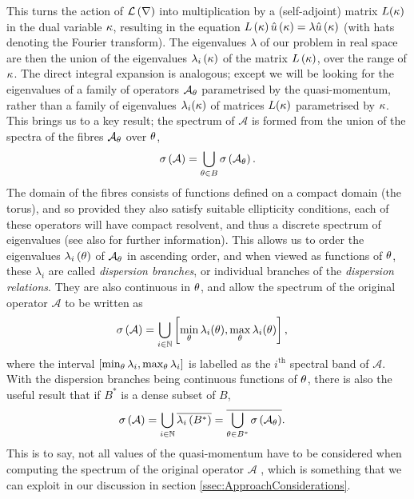 This turns the action of $\mathcal{L}\left( \nabla \right)$ into multiplication by a (self-adjoint) matrix $L(\kappa)$ in the dual variable $\kappa$, resulting in the equation $L\left( \kappa \right)\hat{u}\left( \kappa \right)=\lambda\hat{u}\left( \kappa \right)$ (with hats denoting the Fourier transform).
The eigenvalues $\lambda$ of our problem in real space are then the union of the eigenvalues $\lambda_i\left( \kappa \right)$ of the matrix $L\left( \kappa \right)$, over the range of $\kappa$.
The direct integral expansion is analogous; except we will be looking for the eigenvalues of a family of operators $\mathcal{A}_{\theta}$ parametrised by the quasi-momentum, rather than a family of eigenvalues $\lambda_i(\kappa)$ of matrices $L(\kappa)$ parametrised by $\kappa$. 
This brings us to a key result; the spectrum of $\mathcal{A}$ is formed from the union of the spectra of the fibres $\mathcal{A}_{\theta}$ over $\theta$,
\begin{align*}
	\sigma\left( \mathcal{A} \right) = \bigcup_{\theta\in B}\sigma\left( \mathcal{A}_{\theta} \right).
\end{align*}
The domain of the fibres consists of functions defined on a compact domain (the torus), and so provided they also satisfy suitable ellipticity conditions, each of these operators will have compact resolvent, and thus a discrete spectrum of eigenvalues \cite[section 7.3]{kuchment2001mathematics} (see also \cite[section 4.5]{kuchment1993floquet} for further information).
This allows us to order the eigenvalues $\lambda_i\left( \theta \right)$ of $\mathcal{A}_{\theta}$ in ascending order, and when viewed as functions of $\theta$, these $\lambda_i$ are called \emph{dispersion branches}, or individual branches of the \emph{dispersion relations}.
They are also continuous in $\theta$, and allow the spectrum of the original operator $\mathcal{A}$ to be written as
\begin{align*}
	\sigma\left( \mathcal{A} \right) &= \bigcup_{i\in\mathbb{N}}\left[  \min_{\theta}\lambda_i(\theta), \max_{\theta}\lambda_i(\theta)  \right],
\end{align*}
where the interval $\left[  \min_{\theta}\lambda_i, \max_{\theta}\lambda_i  \right]$ is labelled as the $i^{\text{th}}$ spectral band of $\mathcal{A}$.
With the dispersion branches being continuous functions of $\theta$, there is also the useful result that if $B^*$ is a dense subset of $B$,
\begin{align} \label{eq:TP-DenseQMSubsetSuffices}
	\sigma\left( \mathcal{A} \right) &= \bigcup_{i\in\mathbb{N}}\overline{\lambda_i\left( B^* \right)}
	= \overline{\bigcup_{\theta\in B^*}\sigma\left( \mathcal{A}_{\theta} \right)}.
\end{align}
This is to say, not all values of the quasi-momentum have to be considered when computing the spectrum of the original operator $\mathcal{A}$ \cite[section 7.4]{kuchment2001mathematics}, which is something that we can exploit in our discussion in section \ref{ssec:ApproachConsiderations}.

